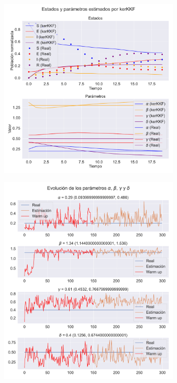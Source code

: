 \begin{figure}[h]
    \centering
    \begin{subfigure}[b]{0.49\textwidth}
         \includegraphics[height=\linewidth]{img/content/chapter4/nonlinear_filters_seir_params.pdf}
         \caption{}
         \label{fig:nonlinear_filters_sir_rec_params}
    \end{subfigure}
    \begin{subfigure}[b]{0.49\textwidth}
         \includegraphics[height=\linewidth]{img/content/chapter4/nonlinear_filters_seir_params_evolution.pdf}

\end{subfigure}
\end{figure}
